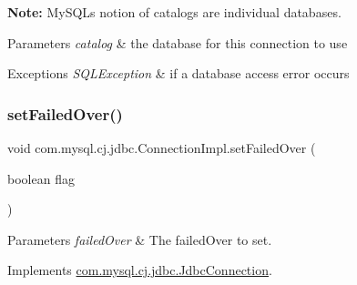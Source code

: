 {\bfseries Note\+:} My\+S\+QL\textquotesingle{}s notion of catalogs are individual databases. 


\begin{DoxyParams}{Parameters}
{\em catalog} & the database for this connection to use \\
\hline
\end{DoxyParams}

\begin{DoxyExceptions}{Exceptions}
{\em S\+Q\+L\+Exception} & if a database access error occurs \\
\hline
\end{DoxyExceptions}
\mbox{\label{classcom_1_1mysql_1_1cj_1_1jdbc_1_1_connection_impl_afef2182754848487fb2e37daea9ff7eb}} 
\subsubsection{\texorpdfstring{set\+Failed\+Over()}{setFailedOver()}}
{\footnotesize\ttfamily void com.\+mysql.\+cj.\+jdbc.\+Connection\+Impl.\+set\+Failed\+Over (\begin{DoxyParamCaption}\item[{boolean}]{flag }\end{DoxyParamCaption})}


\begin{DoxyParams}{Parameters}
{\em failed\+Over} & The failed\+Over to set. \\
\hline
\end{DoxyParams}


Implements \mbox{\hyperlink{interfacecom_1_1mysql_1_1cj_1_1jdbc_1_1_jdbc_connection_a65cb0cc5d2afc54002bfc16222bbe402}{com.\+mysql.\+cj.\+jdbc.\+Jdbc\+Connection}}.

\mbox{\label{classcom_1_1mysql_1_1cj_1_1jdbc_1_1_connection_impl_a70a08ce7c0dea524a32a245986fb1531}} 

